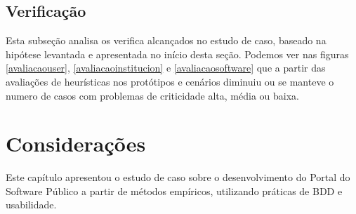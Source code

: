 \subsection{Verificação}

Esta subseção analisa os verifica alcançados no estudo de caso, baseado na hipótese levantada e apresentada no início desta seção. Podemos ver nas figuras \ref{avaliacaouser}, \ref{avaliacaoinstitucion} e \ref{avaliacaosoftware} que a partir das avaliações de heurísticas nos protótipos e cenários diminuiu ou se manteve o numero de casos com problemas de criticidade alta, média ou baixa. 
	

\section{Considerações}

Este capítulo apresentou o estudo de caso sobre o desenvolvimento do Portal do Software Público a partir de métodos empíricos, utilizando práticas de BDD e usabilidade.